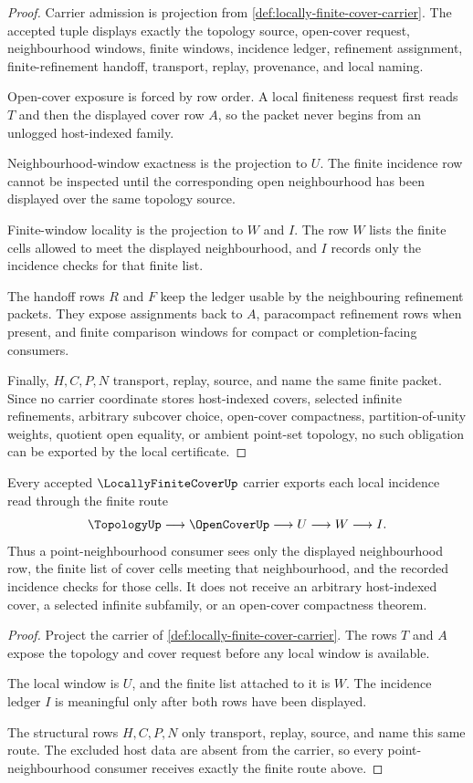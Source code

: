 \begin{proof}
Carrier admission is projection from \autoref{def:locally-finite-cover-carrier}. The accepted tuple displays exactly the topology source, open-cover request, neighbourhood windows, finite windows, incidence ledger, refinement assignment, finite-refinement handoff, transport, replay, provenance, and local naming.

Open-cover exposure is forced by row order. A local finiteness request first reads $T$ and then the displayed cover row $A$, so the packet never begins from an unlogged host-indexed family.

Neighbourhood-window exactness is the projection to $U$. The finite incidence row cannot be inspected until the corresponding open neighbourhood has been displayed over the same topology source.

Finite-window locality is the projection to $W$ and $I$. The row $W$ lists the finite cells allowed to meet the displayed neighbourhood, and $I$ records only the incidence checks for that finite list.

The handoff rows $R$ and $F$ keep the ledger usable by the neighbouring refinement packets. They expose assignments back to $A$, paracompact refinement rows when present, and finite comparison windows for compact or completion-facing consumers.

Finally, $H,C,P,N$ transport, replay, source, and name the same finite packet. Since no carrier coordinate stores host-indexed covers, selected infinite refinements, arbitrary subcover choice, open-cover compactness, partition-of-unity weights, quotient open equality, or ambient point-set topology, no such obligation can be exported by the local certificate.
\end{proof}

\begin{theorem}
\label{thm:locally-finite-cover-finite-window-locality}
Every accepted $\LocallyFiniteCoverUp$ carrier exports each local incidence read through the finite route
$$
\TopologyUp \longrightarrow \OpenCoverUp \longrightarrow U \longrightarrow W \longrightarrow I .
$$
Thus a point-neighbourhood consumer sees only the displayed neighbourhood row, the finite list of cover cells meeting that neighbourhood, and the recorded incidence checks for those cells. It does not receive an arbitrary host-indexed cover, a selected infinite subfamily, or an open-cover compactness theorem.
\end{theorem}
\begin{proof}
Project the carrier of \autoref{def:locally-finite-cover-carrier}. The rows $T$ and $A$ expose the topology and cover request before any local window is available.

The local window is $U$, and the finite list attached to it is $W$. The incidence ledger $I$ is meaningful only after both rows have been displayed.

The structural rows $H,C,P,N$ only transport, replay, source, and name this same route. The excluded host data are absent from the carrier, so every point-neighbourhood consumer receives exactly the finite route above.
\end{proof}

